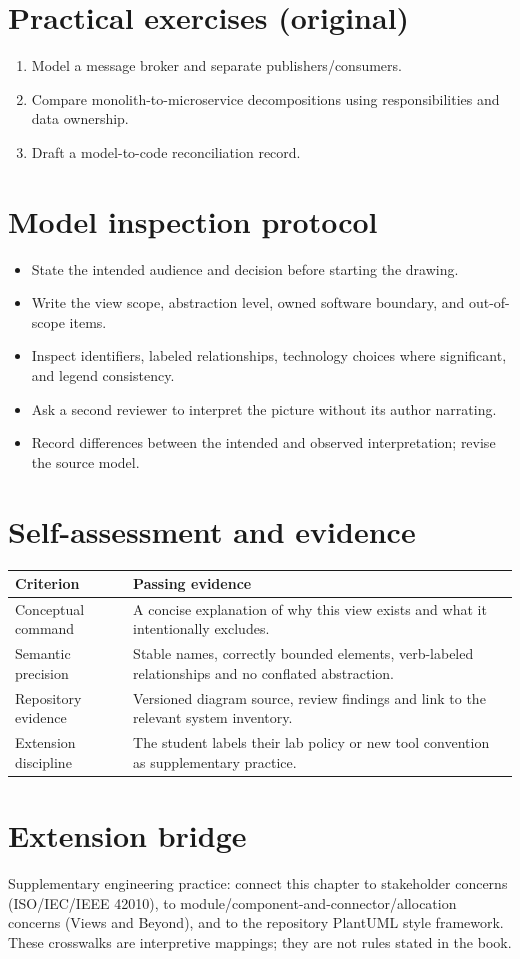 \documentclass[10pt,letterpaper]{article}
\begin{document}
\section{Practical exercises (original)}
\begin{enumerate}
\item Model a message broker and separate publishers/consumers.
\item Compare monolith-to-microservice decompositions using responsibilities and data ownership.
\item Draft a model-to-code reconciliation record.
\end{enumerate}

\section{Model inspection protocol}
\begin{itemize}
\item State the intended audience and decision before starting the drawing.
\item Write the view scope, abstraction level, owned software boundary, and out-of-scope items.
\item Inspect identifiers, labeled relationships, technology choices where significant, and legend consistency.
\item Ask a second reviewer to interpret the picture without its author narrating.
\item Record differences between the intended and observed interpretation; revise the source model.
\end{itemize}

\section{Self-assessment and evidence}
\begin{tabularx}{\linewidth}{@{}YY@{}}\toprule
\textbf{Criterion} & \textbf{Passing evidence} \\ \midrule
Conceptual command & A concise explanation of why this view exists and what it intentionally excludes. \\
Semantic precision & Stable names, correctly bounded elements, verb-labeled relationships and no conflated abstraction. \\
Repository evidence & Versioned diagram source, review findings and link to the relevant system inventory. \\
Extension discipline & The student labels their lab policy or new tool convention as supplementary practice. \\
\bottomrule\end{tabularx}


\section{Extension bridge}
Supplementary engineering practice: connect this chapter to stakeholder concerns (ISO/IEC/IEEE 42010), to module/component-and-connector/allocation concerns (Views and Beyond), and to the repository PlantUML style framework. These crosswalks are interpretive mappings; they are not rules stated in the book.
\end{document}
